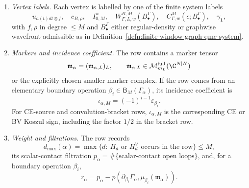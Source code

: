 \begin{defn}
\begin{enumerate}[label=(A\arabic*)]
    \item \emph{Vertex labels.}  Each vertex is labelled by one of the
    finite system labels
    \[
      u_{a(t)dt\otimes f},\quad c_{B,\rho},\quad I^w_{0,M},\quad
      W^{R,M}_{\Gamma,L,w}(B^\Gamma_\bullet),\quad
      C^M_{\Gamma,w}(\epsilon;B^\Gamma_\bullet),\quad
      \gamma_{\mathbf 1},
    \]
    with \(f,\rho\) in degree \(\leq M\) and
    \(B^\Gamma_\bullet\) either regular-density or graphwise
    wavefront-admissible as in
    Definition~\ref{defn:finite-window-graph-qme-system}.

    \item \emph{Markers and incidence coefficient.}  The row contains a
    marker tensor
    \[
      \mathfrak m_\alpha=(\mathfrak m_{\alpha,L})_L,\qquad
      \mathfrak m_{\alpha,L}\in\mathcal M^{\mathrm{full}}_{m_L}(\C^{N|N})
    \]
    or the explicitly chosen smaller marker complex.  If the row comes from
    an elementary boundary operation
    \(\beta_i\in\mathsf B_M(\Gamma_\alpha)\), its incidence coefficient is
    \[
      \iota_{\alpha,M}=(-1)^{i-1}\varepsilon_{\beta_i}.
    \]
    For CE-source and convolution-bracket rows, \(\iota_{\alpha,M}\) is the
    corresponding CE or BV Koszul sign, including the factor \(1/2\) in the
    bracket row.

    \item \emph{Weight and filtrations.}  The row records
    \[
      d_{\max}(\alpha)=
      \max\{d:\ H_d\text{ or }H_d^\vee\text{ occurs in the row}\}\leq M,
    \]
    its scalar-contact filtration
    \(p_\alpha=\#\{\text{scalar-contact open loops}\}\), and, for a boundary
    operation \(\beta_i\),
    \[
      r_\alpha=p_\alpha-
      p(\partial_{\beta_i}\Gamma_\alpha,\mu_{\beta_i}(\mathfrak m_\alpha)).
    \]


\end{enumerate}
\end{defn}
